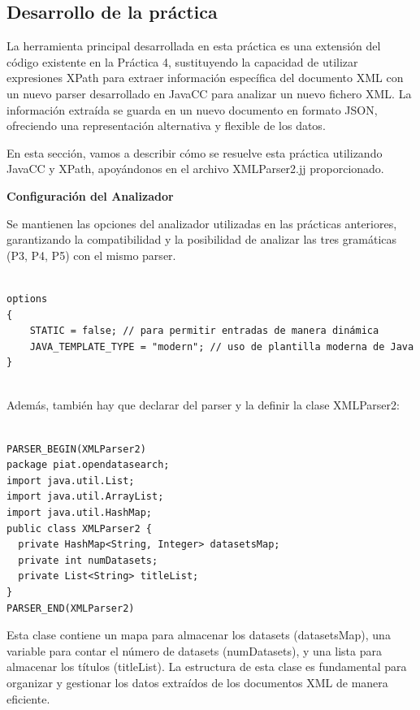 \subsection{Desarrollo de la práctica}

\noindent La herramienta principal desarrollada en esta práctica es una extensión del código existente en la Práctica 4, sustituyendo la capacidad de utilizar expresiones XPath para extraer información específica del documento XML con un nuevo parser desarrollado en JavaCC para analizar un nuevo fichero XML. La información extraída se guarda en un nuevo documento en formato JSON, ofreciendo una representación alternativa y flexible de los datos.

En esta sección, vamos a describir cómo se resuelve esta práctica utilizando JavaCC y XPath, apoyándonos en el archivo XMLParser2.jj proporcionado.

\phantom{text}

\noindent \textbf{Configuración del Analizador}

\phantom{text}

Se mantienen las opciones del analizador utilizadas en las prácticas anteriores, garantizando la compatibilidad y la posibilidad de analizar las tres gramáticas (P3, P4, P5) con el mismo parser.

\lstset{inputencoding=utf8/latin1}
\begin{lstlisting}
    
options
{
    STATIC = false; // para permitir entradas de manera dinámica
    JAVA_TEMPLATE_TYPE = "modern"; // uso de plantilla moderna de Java
}
    
\end{lstlisting}


Además, también hay que declarar del parser y la definir la clase XMLParser2:
\lstset{inputencoding=utf8/latin1}
\begin{lstlisting}

PARSER_BEGIN(XMLParser2)
package piat.opendatasearch;
import java.util.List;
import java.util.ArrayList;
import java.util.HashMap;
public class XMLParser2 {
  private HashMap<String, Integer> datasetsMap;
  private int numDatasets;
  private List<String> titleList;
}
PARSER_END(XMLParser2)

\end{lstlisting}

Esta clase contiene un mapa para almacenar los datasets (datasetsMap), una variable para contar el número de datasets (numDatasets), y una lista para almacenar los títulos (titleList). La estructura de esta clase es fundamental para organizar y gestionar los datos extraídos de los documentos XML de manera eficiente.

